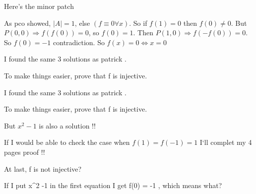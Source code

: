 


\begin{solution}
	Here's the minor patch

As pco showed, $|A| =1$, else $(f\equiv 0 \forall x)$. So if $f(1)=0$ then $f(0)\neq 0$. But $P(0,0) \Rightarrow f(f(0))=0$, so $f(0)=1$. Then $P(1,0) \Rightarrow f(-f(0))=0$. So $f(0)=-1$ contradiction. So $f(x)=0 \Leftrightarrow x=0$
\end{solution}



\begin{solution}
	I found the same 3 solutions as patrick .

To make things easier, prove that f is injective.
\end{solution}



\begin{solution}
	\begin{tcolorbox}I found the same 3 solutions as patrick .

To make things easier, prove that f is injective.\end{tcolorbox}

But $x^2 -1$ is also a solution !!

If I would be able to check the case when $f(1)=f(-1) = 1$ I`ll complet my 4 pages proof !!
\end{solution}



\begin{solution}
	At last, f is not injective?

If I put x^2 -1 in the first equation I get f(0) = -1 , which means what?
\end{solution}



